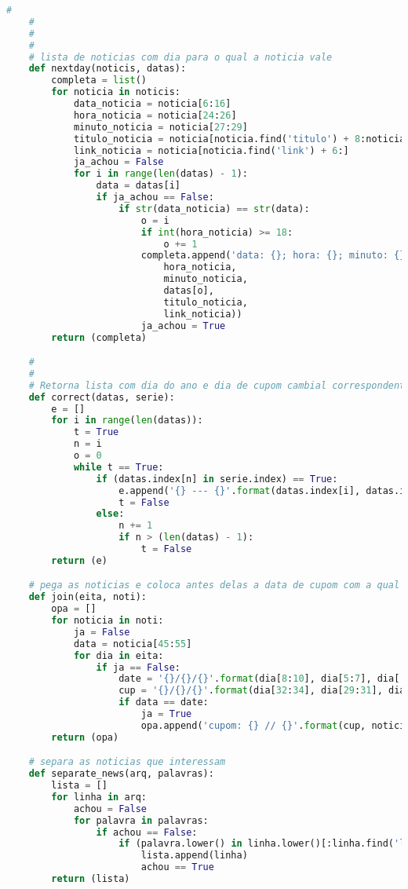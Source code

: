 \begin{lstlisting}[language=Python]
    #
    #
    #
    #
    # lista de noticias com dia para o qual a noticia vale
    def nextday(noticis, datas):
        completa = list()
        for noticia in noticis:
            data_noticia = noticia[6:16]
            hora_noticia = noticia[24:26]
            minuto_noticia = noticia[27:29]
            titulo_noticia = noticia[noticia.find('titulo') + 8:noticia.find('link') - 2]
            link_noticia = noticia[noticia.find('link') + 6:]
            ja_achou = False
            for i in range(len(datas) - 1):
                data = datas[i]
                if ja_achou == False:
                    if str(data_noticia) == str(data):
                        o = i
                        if int(hora_noticia) >= 18:
                            o += 1
                        completa.append('data: {}; hora: {}; minuto: {}; dia: {}; titulo: {}; link: {}'.format(data_noticia,
                            hora_noticia,
                            minuto_noticia,
                            datas[o],
                            titulo_noticia,
                            link_noticia))
                        ja_achou = True
        return (completa)

    #
    #
    # Retorna lista com dia do ano e dia de cupom cambial correspondente
    def correct(datas, serie):
        e = []
        for i in range(len(datas)):
            t = True
            n = i
            o = 0
            while t == True:
                if (datas.index[n] in serie.index) == True:
                    e.append('{} --- {}'.format(datas.index[i], datas.index[n]))
                    t = False
                else:
                    n += 1
                    if n > (len(datas) - 1):
                        t = False
        return (e)

    # pega as noticias e coloca antes delas a data de cupom com a qual ela é relacionada
    def join(eita, noti):
        opa = []
        for noticia in noti:
            ja = False
            data = noticia[45:55]
            for dia in eita:
                if ja == False:
                    date = '{}/{}/{}'.format(dia[8:10], dia[5:7], dia[:4])
                    cup = '{}/{}/{}'.format(dia[32:34], dia[29:31], dia[24:28])
                    if data == date:
                        ja = True
                        opa.append('cupom: {} // {}'.format(cup, noticia))
        return (opa)

    # separa as noticias que interessam
    def separate_news(arq, palavras):
        lista = []
        for linha in arq:
            achou = False
            for palavra in palavras:
                if achou == False:
                    if (palavra.lower() in linha.lower()[:linha.find('link')]) == True:
                        lista.append(linha)
                        achou == True
        return (lista)


\end{lstlisting}
